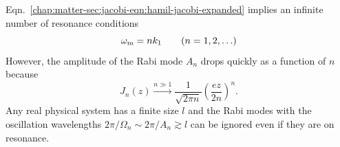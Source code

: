 Eqn.~\ref{chap:matter-sec:jacobi-eqn:hamil-jacobi-expanded} implies an infinite number of resonance conditions
\begin{equation}
    \omega_\mm  = n k_1 \qquad (n=1, 2, \ldots)
    \label{chap:matter-sec:single-revisted-eqn:resonance-condition}
\end{equation}
However, the amplitude of the Rabi mode $A_n$ drops quickly as a function of $n$ because
\begin{equation}
    J_n(z) \xrightarrow{n\gg 1} \frac{1}{\sqrt{2\pi n}} \left( \frac{ e z }{ 2n } \right)^n.
\end{equation}
Any real physical system has a finite size $l$ and the Rabi modes with the oscillation wavelengths $2\pi/\Omega_n\sim 2\pi/A_n  \gtrsim l$ can be ignored even if they are on resonance.





